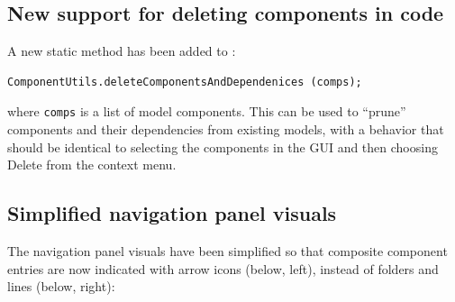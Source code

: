 \documentclass{article}
\begin{document}
\subsection*{New support for deleting components in code}

A new static method has been added to
:
%
\begin{lstlisting}[]
   ComponentUtils.deleteComponentsAndDependenices (comps);
\end{lstlisting}
%
where {\tt comps} is a list of model components. This can be used to
``prune'' components and their dependencies from existing models, with
a behavior that should be identical to selecting the components in the
GUI and then choosing {\sf Delete} from the context menu.

\subsection*{Simplified navigation panel visuals}

The navigation panel visuals have been simplified so that composite
component entries are now indicated with arrow icons (below, left),
instead of folders and lines (below, right):
\end{document}
